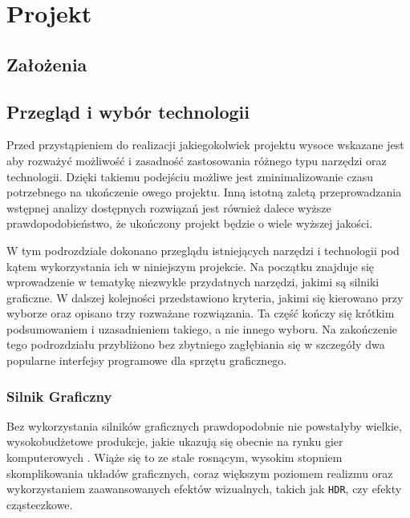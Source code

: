 \documentclass[11pt]{mwrep}
\begin{document}
\chapter{Projekt}

  \section{Założenia}

  \section{Przegląd i wybór technologii}

    Przed przystąpieniem do realizacji jakiegokolwiek projektu wysoce wskazane jest aby rozważyć możliwość i zasadność zastosowania różnego typu narzędzi oraz technologii. Dzięki takiemu podejściu możliwe jest zminimalizowanie czasu potrzebnego na ukończenie owego projektu. Inną istotną zaletą przeprowadzania wstępnej analizy dostępnych rozwiązań jest również dalece wyższe prawdopodobieństwo, że ukończony projekt będzie o wiele wyższej jakości.
  
    W tym podrozdziale dokonano przeglądu istniejących narzędzi i technologii pod kątem wykorzystania ich w niniejszym projekcie. Na początku znajduje się wprowadzenie w tematykę niezwykle przydatnych narzędzi, jakimi są silniki graficzne. W dalszej kolejności przedstawiono kryteria, jakimi się kierowano przy wyborze oraz opisano trzy rozważane rozwiązania. Ta część kończy się krótkim podsumowaniem i uzasadnieniem takiego, a nie innego wyboru. Na zakończenie tego podrozdziału przybliżono bez zbytniego zagłębiania się w szczegóły dwa popularne interfejsy programowe dla sprzętu graficznego.

    \subsection{Silnik Graficzny}

    Bez wykorzystania silników graficznych prawdopodobnie nie powstałyby wielkie, wy\-so\-ko\-bud\-że\-to\-we produkcje, jakie ukazują się obecnie na rynku gier komputerowych	. Wiąże się to ze stale rosnącym, wysokim stopniem skomplikowania układów graficznych, coraz większym poziomem realizmu oraz wykorzystaniem zaawansowanych efektów wizualnych, takich jak \texttt{HDR}, czy efekty cząsteczkowe. 
\end{document}
